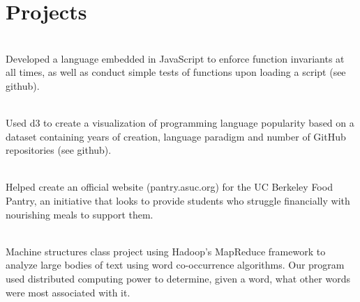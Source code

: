 \documentclass[]{deedy-resume-openfont}
\begin{document}
\begin{minipage}[t]{0.64\textwidth}

\section{Projects}
\sectionsep
{}\\
Developed a language embedded in JavaScript to enforce function invariants at all times, as well as conduct simple tests of functions upon loading a script (see github).

\sectionsep
{}\\
Used d3 to create a visualization of programming language popularity based on a dataset containing years of creation, language paradigm and number of GitHub repositories (see github).

\sectionsep
{}\\
Helped create an official website (pantry.asuc.org) for the UC Berkeley Food Pantry, an initiative that looks to provide students who struggle financially with nourishing meals to support them.

\sectionsep
{}\\
Machine structures class project using Hadoop's MapReduce framework to analyze large bodies of text using word co-occurrence algorithms. Our program used distributed computing power to determine, given a word, what other words were most associated with it.
\sectionsep


\begin{comment}
\section{Awards} 
\sectionsep
\begin{tabular}{rll}
2014	     & top 52/2500  & KPCB Engineering Fellow\\
2014	     & 2\textsuperscript{nd} most points  & Google Code Jam, Qualification Round\\
2014	     & 1\textsuperscript{st}/50  & Microsoft Coding Competition, Cornell\\
2013	     & National  & Jump Trading Challenge Finalist\\
2013     & 7\textsuperscript{th}/120 & CS 3410 Cache Race Bot Tournament  \\
2012     & 2\textsuperscript{nd}/150 & CS 3110 Biannual Intra-Class Bot Tournament \\
\end{tabular}
\end{comment}


\end{minipage}
\end{document}
